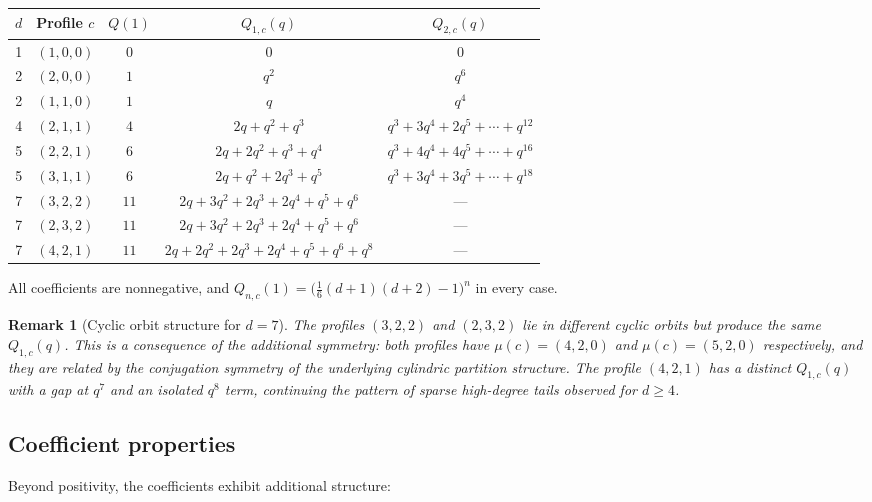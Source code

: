 \documentclass[11pt]{article}
\newtheorem{remark}[theorem]{Remark}
\begin{document}
\begin{center}
\begin{tabular}{c|c|c|c|c}
$d$ & Profile $c$ & $Q(1)$ & $Q_{1,c}(q)$ & $Q_{2,c}(q)$ \\
\hline
1 & $(1,0,0)$ & $0$ & $0$ & $0$ \\
2 & $(2,0,0)$ & $1$ & $q^2$ & $q^6$ \\
2 & $(1,1,0)$ & $1$ & $q$ & $q^4$ \\
4 & $(2,1,1)$ & $4$ & $2q + q^2 + q^3$ & $q^3 + 3q^4 + 2q^5 + \cdots + q^{12}$ \\
5 & $(2,2,1)$ & $6$ & $2q + 2q^2 + q^3 + q^4$ & $q^3 + 4q^4 + 4q^5 + \cdots + q^{16}$ \\
5 & $(3,1,1)$ & $6$ & $2q + q^2 + 2q^3 + q^5$ & $q^3 + 3q^4 + 3q^5 + \cdots + q^{18}$ \\
7 & $(3,2,2)$ & $11$ & $2q + 3q^2 + 2q^3 + 2q^4 + q^5 + q^6$ & --- \\
7 & $(2,3,2)$ & $11$ & $2q + 3q^2 + 2q^3 + 2q^4 + q^5 + q^6$ & --- \\
7 & $(4,2,1)$ & $11$ & $2q + 2q^2 + 2q^3 + 2q^4 + q^5 + q^6 + q^8$ & --- \\
\end{tabular}
\end{center}

All coefficients are nonnegative, and $Q_{n,c}(1) = \bigl(\tfrac{1}{6}(d+1)(d+2) - 1\bigr)^n$
in every case.

\begin{remark}[Cyclic orbit structure for $d = 7$]
The profiles $(3,2,2)$ and $(2,3,2)$ lie in different cyclic orbits but produce the
same $Q_{1,c}(q)$. This is a consequence of the additional symmetry: both profiles
have $\mu(c) = (4,2,0)$ and $\mu(c) = (5,2,0)$ respectively, and they are related
by the conjugation symmetry of the underlying cylindric partition structure. The
profile $(4,2,1)$ has a distinct $Q_{1,c}(q)$ with a gap at $q^7$ and an isolated
$q^8$ term, continuing the pattern of sparse high-degree tails observed for $d \geq 4$.
\end{remark}

\subsection{Coefficient properties}

Beyond positivity, the coefficients exhibit additional structure:
\end{document}
